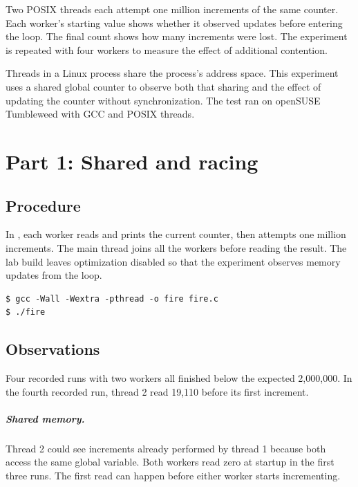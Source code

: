 \documentclass{../latex/utmreport}
\begin{document}
\makeutmreporttitlepage
\tableofcontents
\clearpage

\begin{utmabstract}[Abstract]
Two POSIX threads each attempt one million increments of the same counter. Each worker's starting value shows whether it observed updates before entering the loop. The final count shows how many increments were lost. The experiment is repeated with four workers to measure the effect of additional contention.
\end{utmabstract}

\utmintroduction
Threads in a Linux process share the process's address space. This experiment uses a shared global counter to observe both that sharing and the effect of updating the counter without synchronization. The test ran on openSUSE Tumbleweed with GCC and POSIX threads.

\chapter{Part 1: Shared and racing}

\section{Procedure}
In , each worker reads and prints the current counter, then attempts one million increments. The main thread joins all the workers before reading the result. The lab build leaves optimization disabled so that the experiment observes memory updates from the loop.

\begin{lstlisting}
$ gcc -Wall -Wextra -pthread -o fire fire.c
$ ./fire
\end{lstlisting}

\section{Observations}
Four recorded runs with two workers all finished below the expected 2,000,000. In the fourth recorded run, thread 2 read 19,110 before its first increment.



\paragraph{Shared memory.}
Thread 2 could see increments already performed by thread 1 because both access the same global variable. Both workers read zero at startup in the first three runs. The first read can happen before either worker starts incrementing.
\end{document}
